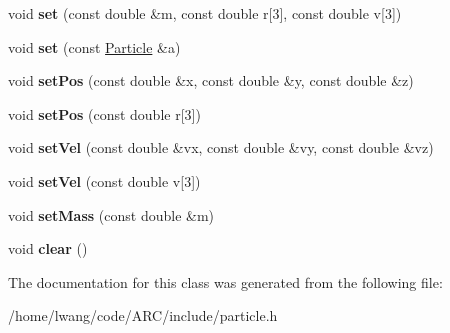 \begin{DoxyCompactItemize}
\item 
\hypertarget{classParticle_aaf5638f0bb588011e8921bc3e0a446a1}{
void {\bfseries set} (const double \&m, const double r\mbox{[}3\mbox{]}, const double v\mbox{[}3\mbox{]})}
\label{classParticle_aaf5638f0bb588011e8921bc3e0a446a1}

\item 
\hypertarget{classParticle_a77b1b13894b46abed113c461270ed927}{
void {\bfseries set} (const \hyperlink{classParticle}{Particle} \&a)}
\label{classParticle_a77b1b13894b46abed113c461270ed927}

\item 
\hypertarget{classParticle_acced20d7a1e53610759e894db36c5588}{
void {\bfseries setPos} (const double \&x, const double \&y, const double \&z)}
\label{classParticle_acced20d7a1e53610759e894db36c5588}

\item 
\hypertarget{classParticle_ab3c50e74691f9264d4d4d2e72a6b9536}{
void {\bfseries setPos} (const double r\mbox{[}3\mbox{]})}
\label{classParticle_ab3c50e74691f9264d4d4d2e72a6b9536}

\item 
\hypertarget{classParticle_a926459cb76187c3b63fb48d284e7261e}{
void {\bfseries setVel} (const double \&vx, const double \&vy, const double \&vz)}
\label{classParticle_a926459cb76187c3b63fb48d284e7261e}

\item 
\hypertarget{classParticle_a433720a7673f9645e4e203c32435e301}{
void {\bfseries setVel} (const double v\mbox{[}3\mbox{]})}
\label{classParticle_a433720a7673f9645e4e203c32435e301}

\item 
\hypertarget{classParticle_a0328f19e5c4aa4d97bdef991aac6e838}{
void {\bfseries setMass} (const double \&m)}
\label{classParticle_a0328f19e5c4aa4d97bdef991aac6e838}

\item 
\hypertarget{classParticle_ab0eea4368ee797652c528949ab4ac563}{
void {\bfseries clear} ()}
\label{classParticle_ab0eea4368ee797652c528949ab4ac563}

\end{DoxyCompactItemize}


The documentation for this class was generated from the following file:\begin{DoxyCompactItemize}
\item 
/home/lwang/code/ARC/include/particle.h\end{DoxyCompactItemize}
